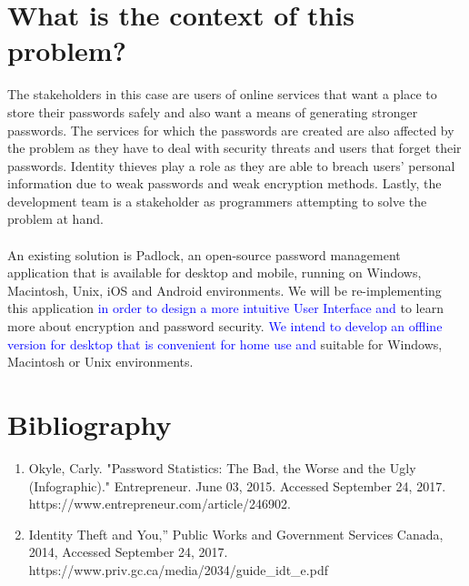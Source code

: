 \documentclass{article}
\begin{document}
\section*{What is the context of this problem?}
The stakeholders in this case are users of online services that want a place to store their passwords safely and also want a means of generating stronger passwords. The services for which the passwords are created are also affected by the problem as they have to deal with security threats and users that forget their passwords. Identity thieves play a role as they are able to breach users’ personal information due to weak passwords and weak encryption methods. Lastly, the development team is a stakeholder as programmers attempting to solve the problem at hand. \\
\\
An existing solution is Padlock, an open-source password management application that is available for desktop and mobile, running on Windows, Macintosh, Unix, iOS and Android environments. We will be re-implementing this application \textcolor{blue}{in order to design a more intuitive User Interface and} to learn more about encryption and password security. \textcolor{blue}{We intend to develop an offline version for desktop that is convenient for home use and} suitable for Windows, Macintosh or Unix environments. 

\section*{Bibliography}

\begin{enumerate}
    \item Okyle, Carly. "Password Statistics: The Bad, the Worse and the Ugly (Infographic)." Entrepreneur. June 03, 2015. Accessed September 24, 2017. https://www.entrepreneur.com/article/246902.
    \item Identity Theft and You,” Public Works and Government Services Canada, 2014, Accessed September 24, 2017.\\ https://www.priv.gc.ca/media/2034/guide\_idt\_e.pdf
\end{enumerate}
\end{document}
